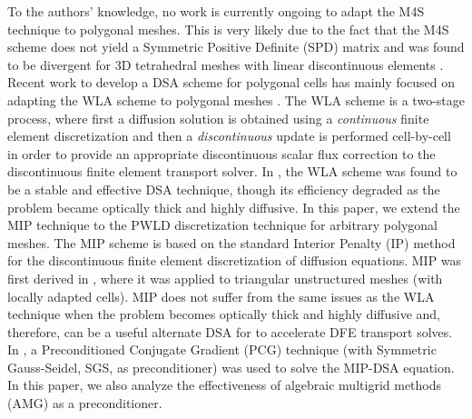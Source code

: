 \documentclass[preprint,10pt]{elsarticle}
\renewcommand{\(}{\left(}
\renewcommand{\)}{\right)}
\renewcommand{\[}{\left[}
\renewcommand{\]}{\right]}
\begin{document}

To the authors' knowledge, no work is currently ongoing to adapt the M4S 
technique to polygonal meshes. This is very likely due to the fact
that the M4S scheme does not yield a Symmetric Positive Definite (SPD)
matrix and was found to be divergent for 3D tetrahedral meshes with linear 
discontinuous elements \cite{consistent_p1}. 
% 
Recent work to develop a DSA scheme for polygonal cells has mainly focused 
on adapting the WLA scheme to polygonal meshes
\cite{cfm_dfm,wla_pwl}. The WLA scheme is a two-stage process, where first a
diffusion solution is obtained using a {\em continuous} finite element
discretization and then a {\em discontinuous} update is performed cell-by-cell 
in order to provide an appropriate discontinuous scalar flux correction to 
the discontinuous finite element transport 
solver. In \cite{consistent_p1}, the WLA scheme was
found to be a stable and effective DSA technique, though its efficiency
degraded as the problem became optically thick and highly diffusive.
%
In this paper, we extend the MIP technique to the
PWLD discretization technique for arbitrary polygonal meshes.
The MIP scheme is based on the standard Interior Penalty (IP) method for the
discontinuous finite element discretization of diffusion equations. MIP was first derived in
\cite{mip}, where it was applied to triangular unstructured meshes (with
locally adapted cells). MIP does not suffer from the same issues as the WLA technique when the
problem becomes optically thick and highly diffusive and, therefore, can be a
useful alternate DSA for to accelerate DFE transport solves. 
In \cite{mip}, a Preconditioned Conjugate Gradient (PCG) technique (with Symmetric Gauss-Seidel, 
SGS, as preconditioner) was used to solve the MIP-DSA equation. In this paper, we also analyze  
the effectiveness of algebraic multigrid methods (AMG) \cite{amg,amg_course} as a preconditioner. 
\end{document}
